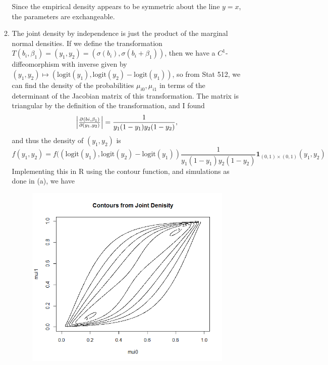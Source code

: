 \documentclass[11pt]{article}
\begin{document}
\begin{enumerate}
\begin{enumerate}
\begin{figure}[H]
			\end{figure}
			Since the empirical density appears to be symmetric about the line $y=x$, the parameters are exchangeable.
			\item 
			The joint density by independence is just the product of the marginal normal densities. If we define the transformation $T(b_i,\beta_1) = (y_1,y_2) = (\sigma(b_i),\sigma(b_i+\beta_1))$, then we have a $C^1$-diffeomorphism with inverse given by $(y_1,y_2)\mapsto (\mathrm{logit}(y_1),\mathrm{logit}(y_2)-\mathrm{logit}(y_1))$, so from Stat 512, we can find the density of the probabilities $\mu_{i0}, \mu_{i1}$ in terms of the determinant of the Jacobian matrix of this transformation. The matrix is triangular by the definition of the transformation, and I found
			\[
				\left|\pd{(bi,\beta_1)}{(y_1,y_2)}\right| = 					\frac{1}{y_1(1-y_1)y_2(1-y_2)},
			\]
			and thus the density of $(y_1,y_2)$ is
			\[
				f(y_1,y_2) = f((\mathrm{logit}(y_1),\mathrm{logit}(y_2)-\mathrm{logit}(y_1))\frac{1}{y_1(1-y_1)y_2(1-y_2)}\bm{1}_{(0,1)\times(0,1)}(y_1,y_2)
			\]
			Implementing this in R using the contour function, and simulations as done in (a), we have
			\begin{figure}[H]
				\includegraphics[scale=0.4]{Rplotp33}

\end{figure}
\end{enumerate}
\end{enumerate}
\end{document}

